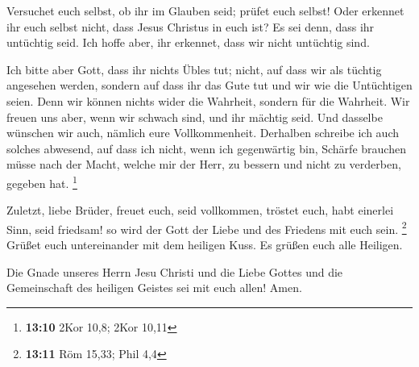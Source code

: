  Versuchet euch selbst, ob ihr im Glauben seid; prüfet euch
selbst! Oder erkennet ihr euch selbst nicht, dass Jesus Christus in euch
ist? Es sei denn, dass ihr untüchtig seid.  Ich hoffe aber,
ihr erkennet, dass wir nicht untüchtig sind.

 Ich bitte aber Gott, dass ihr nichts Übles tut; nicht, auf
dass wir als tüchtig angesehen werden, sondern auf dass ihr das Gute tut
und wir wie die Untüchtigen seien.  Denn wir können nichts
wider die Wahrheit, sondern für die Wahrheit.  Wir freuen
uns aber, wenn wir schwach sind, und ihr mächtig seid. Und dasselbe
wünschen wir auch, nämlich eure Vollkommenheit.  Derhalben
schreibe ich auch solches abwesend, auf dass ich nicht, wenn ich
gegenwärtig bin, Schärfe brauchen müsse nach der Macht, welche mir der
Herr, zu bessern und nicht zu verderben, gegeben hat. \footnote{\textbf{13:10}
  2Kor 10,8; 2Kor 10,11}

 Zuletzt, liebe Brüder, freuet euch, seid vollkommen,
tröstet euch, habt einerlei Sinn, seid friedsam! so wird der Gott der
Liebe und des Friedens mit euch sein. \footnote{\textbf{13:11} Röm
  15,33; Phil 4,4}  Grüßet euch untereinander mit dem
heiligen Kuss. Es grüßen euch alle Heiligen.

 Die Gnade unseres Herrn Jesu Christi und die Liebe Gottes
und die Gemeinschaft des heiligen Geistes sei mit euch allen! Amen.
